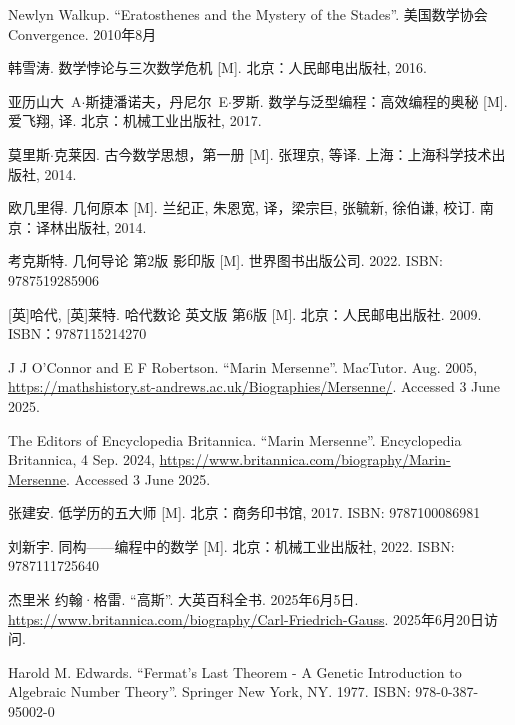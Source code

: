 Newlyn Walkup. ``Eratosthenes and the Mystery of the Stades''. 美国数学协会 Convergence. 2010年8月

韩雪涛. 数学悖论与三次数学危机 [M]. 北京：人民邮电出版社, 2016. %

亚历山大\ A$\cdot$斯捷潘诺夫，丹尼尔\ E$\cdot$罗斯. 数学与泛型编程：高效编程的奥秘 [M]. 爱飞翔, 译. 北京：机械工业出版社, 2017. %

莫里斯$\cdot$克莱因. 古今数学思想，第一册 [M]. 张理京, 等译. 上海：上海科学技术出版社, 2014. %

欧几里得. 几何原本 [M]. 兰纪正, 朱恩宽, 译，梁宗巨, 张毓新, 徐伯谦, 校订. 南京：译林出版社, 2014. %

考克斯特. 几何导论 第2版 影印版 [M]. 世界图书出版公司. 2022. ISBN: 9787519285906

[英]哈代, [英]莱特. 哈代数论 英文版 第6版 [M]. 北京：人民邮电出版社. 2009. ISBN：9787115214270

J J O'Connor and E F Robertson. ``Marin Mersenne''. MacTutor. Aug. 2005, \url{https://mathshistory.st-andrews.ac.uk/Biographies/Mersenne/}. Accessed 3 June 2025.

The Editors of Encyclopedia Britannica. ``Marin Mersenne''. Encyclopedia Britannica, 4 Sep. 2024, \url{https://www.britannica.com/biography/Marin-Mersenne}. Accessed 3 June 2025.

张建安. 低学历的五大师 [M]. 北京：商务印书馆, 2017. ISBN: 9787100086981

刘新宇. 同构——编程中的数学 [M]. 北京：机械工业出版社, 2022. ISBN: 9787111725640

杰里米 约翰·格雷. ``高斯''. 大英百科全书. 2025年6月5日. \url{https://www.britannica.com/biography/Carl-Friedrich-Gauss}. 2025年6月20日访问.

Harold M. Edwards. ``Fermat's Last Theorem - A Genetic Introduction to Algebraic Number Theory''. Springer New York, NY. 1977. ISBN: 978-0-387-95002-0

